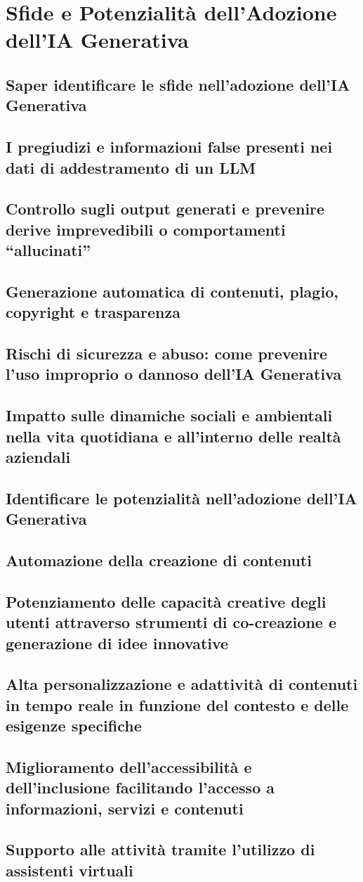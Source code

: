\section{Sfide e Potenzialità dell'Adozione dell'IA Generativa}
    \subsection{Saper identificare le sfide nell'adozione dell'IA Generativa}
    \subsection{I pregiudizi e informazioni false presenti nei dati di addestramento di un LLM}
    \subsection{Controllo sugli output generati e prevenire derive imprevedibili o comportamenti ``allucinati''}
    \subsection{Generazione automatica di contenuti, plagio, copyright e trasparenza}
    \subsection{Rischi di sicurezza e abuso: come prevenire l'uso improprio o dannoso dell'IA Generativa}
    \subsection{Impatto sulle dinamiche sociali e ambientali nella vita quotidiana e all'interno delle realtà aziendali}
    \subsection{Identificare le potenzialità nell'adozione dell'IA Generativa}
    \subsection{Automazione della creazione di contenuti}
    \subsection{Potenziamento delle capacità creative degli utenti attraverso strumenti di co-creazione e generazione di idee innovative}
    \subsection{Alta personalizzazione e adattività di contenuti in tempo reale in funzione del contesto e delle esigenze specifiche}
    \subsection{Miglioramento dell'accessibilità e dell'inclusione facilitando l'accesso a informazioni, servizi e contenuti}
    \subsection{Supporto alle attività tramite l’utilizzo di assistenti virtuali}
